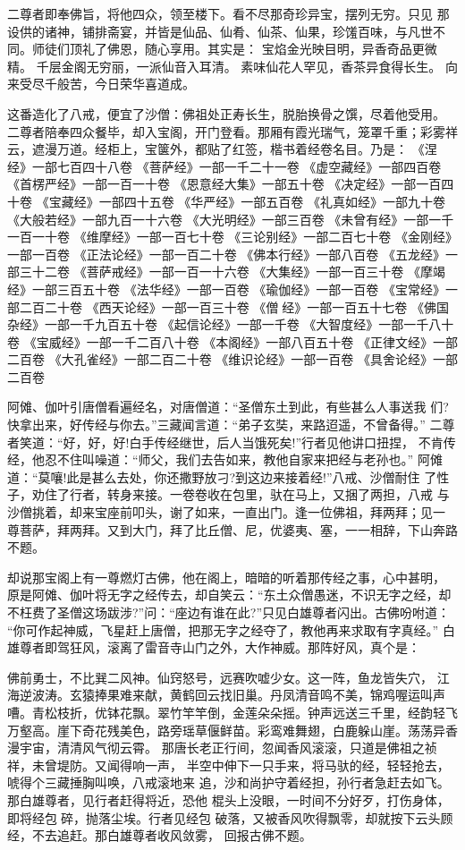 二尊者即奉佛旨，将他四众，领至楼下。看不尽那奇珍异宝，摆列无穷。只见
那设供的诸神，铺排斋宴，并皆是仙品、仙肴、仙茶、仙果，珍馐百味，与凡世不
同。师徒们顶礼了佛恩，随心享用。其实是：
宝焰金光映目明，异香奇品更微精。
千层金阁无穷丽，一派仙音入耳清。
素味仙花人罕见，香茶异食得长生。
向来受尽千般苦，今日荣华喜道成。

这番造化了八戒，便宜了沙僧：佛祖处正寿长生，脱胎换骨之馔，尽着他受用。
二尊者陪奉四众餐毕，却入宝阁，开门登看。那厢有霞光瑞气，笼罩千重；彩雾祥
云，遮漫万道。经柜上，宝箧外，都贴了红签，楷书着经卷名目。乃是：
《涅经》一部七百四十八卷
《菩萨经》一部一千二十一卷
《虚空藏经》一部四百卷
《首楞严经》一部一百一十卷
《恩意经大集》一部五十卷
《决定经》一部一百四十卷
《宝藏经》一部四十五卷
《华严经》一部五百卷
《礼真如经》一部九十卷
《大般若经》一部九百一十六卷
《大光明经》一部三百卷
《未曾有经》一部一千一百一十卷
《维摩经》一部一百七十卷
《三论别经》一部二百七十卷
《金刚经》一部一百卷
《正法论经》一部一百二十卷
《佛本行经》一部八百卷
《五龙经》一部三十二卷
《菩萨戒经》一部一百一十六卷
《大集经》一部一百三十卷
《摩竭经》一部三百五十卷
《法华经》一部一百卷
《瑜伽经》一部一百卷
《宝常经》一部二百二十卷
《西天论经》一部一百三十卷
《僧经》一部一百五十七卷
《佛国杂经》一部一千九百五十卷
《起信论经》一部一千卷
《大智度经》一部一千八十卷
《宝威经》一部一千二百八十卷
《本阁经》一部八百五十卷
《正律文经》一部二百卷
《大孔雀经》一部二百二十卷
《维识论经》一部一百卷
《具舍论经》一部二百卷

阿傩、伽叶引唐僧看遍经名，对唐僧道：“圣僧东土到此，有些甚么人事送我
们?快拿出来，好传经与你去。”三藏闻言道：“弟子玄奘，来路迢遥，不曾备得。”
二尊者笑道：“好，好，好!白手传经继世，后人当饿死矣!”行者见他讲口扭捏，
不肯传经，他忍不住叫噪道：“师父，我们去告如来，教他自家来把经与老孙也。”
阿傩道：“莫嚷!此是甚么去处，你还撒野放刁?到这边来接着经!”八戒、沙僧耐住
了性子，劝住了行者，转身来接。一卷卷收在包里，驮在马上，又捆了两担，八戒
与沙僧挑着，却来宝座前叩头，谢了如来，一直出门。逢一位佛祖，拜两拜；见一
尊菩萨，拜两拜。又到大门，拜了比丘僧、尼，优婆夷、塞，一一相辞，下山奔路
不题。

却说那宝阁上有一尊燃灯古佛，他在阁上，暗暗的听着那传经之事，心中甚明，
原是阿傩、伽叶将无字之经传去，却自笑云：“东土众僧愚迷，不识无字之经，却
不枉费了圣僧这场跋涉?”问：“座边有谁在此?”只见白雄尊者闪出。古佛吩咐道：
“你可作起神威，飞星赶上唐僧，把那无字之经夺了，教他再来求取有字真经。”
白雄尊者即驾狂风，滚离了雷音寺山门之外，大作神威。那阵好风，真个是：

佛前勇士，不比巽二风神。仙窍怒号，远赛吹嘘少女。这一阵，鱼龙皆失穴，
江海逆波涛。玄猿捧果难来献，黄鹤回云找旧巢。丹凤清音鸣不美，锦鸡喔运叫声
嘈。青松枝折，优钵花飘。翠竹竿竿倒，金莲朵朵摇。钟声远送三千里，经韵轻飞
万壑高。崖下奇花残美色，路旁瑶草偃鲜苗。彩鸾难舞翅，白鹿躲山崖。荡荡异香
漫宇宙，清清风气彻云霄。
那唐长老正行间，忽闻香风滚滚，只道是佛祖之祯祥，未曾堤防。又闻得响一声，
半空中伸下一只手来，将马驮的经，轻轻抢去，唬得个三藏捶胸叫唤，八戒滚地来
追，沙和尚护守着经担，孙行者急赶去如飞。那白雄尊者，见行者赶得将近，恐他
棍头上没眼，一时间不分好歹，打伤身体，即将经包碎，抛落尘埃。行者见经包
破落，又被香风吹得飘零，却就按下云头顾经，不去追赶。那白雄尊者收风敛雾，
回报古佛不题。

